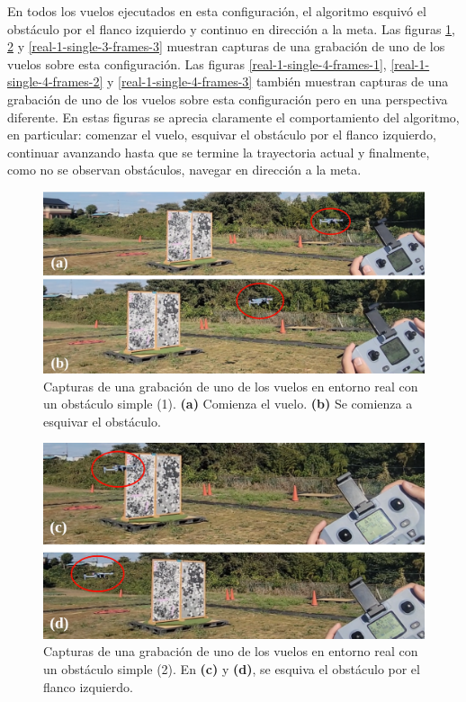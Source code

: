 En todos los vuelos ejecutados en esta configuración, el algoritmo esquivó el obstáculo por el flanco izquierdo y continuo en dirección a la meta. Las figuras \ref{real-1-single-3-frames-1}, \ref{real-1-single-3-frames-2} y \ref{real-1-single-3-frames-3} muestran capturas de una grabación de uno de los vuelos sobre esta configuración. Las figuras \ref{real-1-single-4-frames-1}, \ref{real-1-single-4-frames-2} y \ref{real-1-single-4-frames-3} también muestran capturas de una grabación de uno de los vuelos sobre esta configuración pero en una perspectiva diferente. En estas figuras se aprecia claramente el comportamiento del algoritmo, en particular: comenzar el vuelo, esquivar el obstáculo por el flanco izquierdo, continuar avanzando hasta que se termine la trayectoria actual y finalmente, como no se observan obstáculos, navegar en dirección a la meta.

\begin{figure}[H]
    \centering
    \includegraphics[scale=0.25]{partes/img/real-1-single-3-frames-1.png}
    \caption[Capturas de una grabación de uno de los vuelos en entorno real con un obstáculo simple (1).]{Capturas de una grabación de uno de los vuelos en entorno real con un obstáculo simple (1). \textbf{(a)} Comienza el vuelo. \textbf{(b)} Se comienza a esquivar el obstáculo.}
    \label{real-1-single-3-frames-1}
\end{figure}

\begin{figure}[H]
    \centering
    \includegraphics[scale=0.255]{partes/img/real-1-single-3-frames-2.png}
    \caption[Capturas de una grabación de uno de los vuelos en entorno real con un obstáculo simple (2).]{Capturas de una grabación de uno de los vuelos en entorno real con un obstáculo simple (2). En \textbf{(c)} y \textbf{(d)}, se esquiva el obstáculo por el flanco izquierdo.}
    \label{real-1-single-3-frames-2}
\end{figure}

